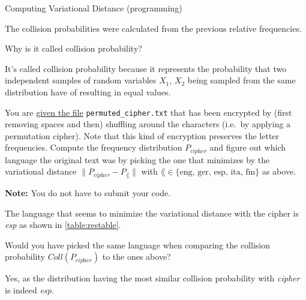 \documentclass[a4paper,10pt]{article}
\begin{document}
\begin{nproblem}{8}{Computing Variational Distance (programming)}
\begin{solution}
The collision probabilities were calculated from the previous relative frequencies.


\end{solution}

\begin{subproblem}{1}
 Why is it called collision probability?
\end{subproblem}
\begin{solution}
It's called collision probability because it represents the probability that two independent
samples of random variables $X_1$, $X_2$ being sampled from the same distribution have of resulting
in equal values.
\end{solution}

\begin{subproblem}{2}
  You are \href{https://github.com/cschaffner/InformationTheory/blob/master/Problems/HW1/permuted_cipher.txt}{given the file} {\texttt{permuted\_cipher.txt}} that has been encrypted by (first removing spaces and then) shuffling around the
characters (i.e.\ by applying a permutation cipher). Note that this kind of
encryption preserves the letter frequencies. Compute the frequency distribution
$P_{\textit{cipher}}$ and figure out which language the original text was by
picking the one that minimizes by the variational distance
$\| P_{\textit{cipher}} - P_{\lang}\|$ with $\lang \in \{
\textrm{eng, ger, esp, ita, fin} \}$ as above.

\textbf{Note:} You do not have to submit your code.
\end{subproblem}
\begin{solution}
The language that seems to minimize the variational distance with the cipher is \textit{esp} as shown
in \autoref{table:restable}.
\end{solution}

\begin{subproblem}{1}
Would you have picked the same language when comparing the collision probability $Coll(P_{\textit{cipher}})$ to the ones above?
\end{subproblem}
\begin{solution}
Yes, as the distribution having the most similar collision probability with \textit{cipher} is indeed \textit{esp}.
\end{solution}

\end{nproblem}




\end{document}
